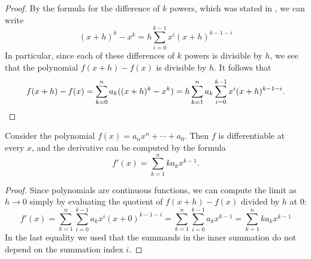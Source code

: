 \begin{proof}
  By the formula for the difference of $k$\supth{} powers, which was stated in , we can write
  \begin{equation*}
    (x+h)^k-x^k= h\sum_{i=0}^{k-1}x^i(x+h)^{k-1-i}
  \end{equation*}
  In particular, since each of these differences of $k$\supth{} powers is divisible by $h$, we see that the polynomial $f(x+h)-f(x)$ is divisible by $h$. It follows that
  \begin{equation*}
    f(x+h)-f(x) = \sum_{k=0}^na_k((x+h)^k-x^k) = h\sum_{k=1}^na_k\sum_{i=0}^{k-1}x^i(x+h)^{k-1-i}. \qedhere
  \end{equation*}
\end{proof}

\begin{theorem}
  Consider the polynomial $f(x)=a_nx^n+\cdots+a_0$. Then $f$ is differentiable at every $x$, and the derivative can be computed by the formula
  \begin{equation*}
    f'(x) = \sum_{k=1}^n ka_kx^{k-1}.
  \end{equation*}
\end{theorem}

\begin{proof}
  Since polynomials are continuous functions, we can compute the limit as $h\to 0$ simply by evaluating the quotient of $f(x+h)-f(x)$ divided by $h$ at $0$:
  \begin{equation*}
    f'(x)=\sum_{k=1}^n\sum_{i=0}^{k-1}a_kx^i(x+0)^{k-1-i}=\sum_{k=1}^n\sum_{i=0}^{k-1}a_kx^{k-1}=\sum_{k=1}^n ka_kx^{k-1}
  \end{equation*}
  In the last equality we used that the summands in the inner summation do not depend on the summation index $i$.
\end{proof}

